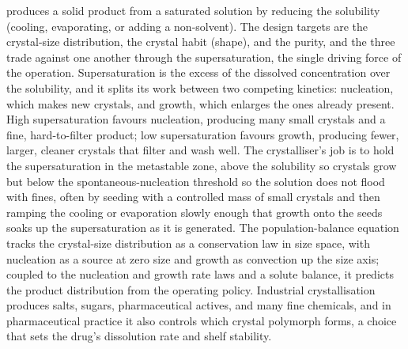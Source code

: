  produces a solid product from a saturated
solution by reducing the solubility (cooling, evaporating, or
adding a non-solvent). The design targets are the crystal-size
distribution, the crystal habit (shape), and the purity, and the three
trade against one another through the supersaturation, the single driving
force of the operation. Supersaturation is the excess of the dissolved
concentration over the solubility, and it splits its work between two
competing kinetics: nucleation, which makes new crystals, and growth,
which enlarges the ones already present. High supersaturation favours
nucleation, producing many small crystals and a fine, hard-to-filter
product; low supersaturation favours growth, producing fewer, larger,
cleaner crystals that filter and wash well. The crystalliser's job is to
hold the supersaturation in the metastable zone, above the solubility so
crystals grow but below the spontaneous-nucleation threshold so the
solution does not flood with fines, often by seeding with a controlled
mass of small crystals and then ramping the cooling or evaporation slowly
enough that growth onto the seeds soaks up the supersaturation as it is
generated. The population-balance equation tracks the crystal-size
distribution as a conservation law in size space, with nucleation as a
source at zero size and growth as convection up the size axis; coupled to
the nucleation and growth rate laws and a solute balance, it predicts the
product distribution from the operating policy. Industrial
crystallisation produces salts, sugars, pharmaceutical actives, and many
fine chemicals, and in pharmaceutical practice it also controls which
crystal polymorph forms, a choice that sets the drug's dissolution rate
and shelf stability.

